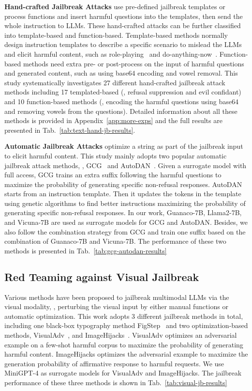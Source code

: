 \noindent\textbf{Hand-crafted Jailbreak Attacks} use pre-defined jailbreak templates or process functions and insert harmful questions into the templates, then send the whole instruction to LLMs. These hand-crafted attacks can be further classified into template-based and function-based. 
Template-based methods normally design instruction templates to describe a specific scenario to mislead the LLMs and elicit harmful content, such as role-playing~\cite{wei2024jailbroken} and do-anything-now~\cite{wei2024jailbroken}. 
Function-based methods need extra pre- or post-process on the input of harmful questions and generated content, such as using base64 encoding and vowel removal. 
This study systematically investigates 27 different hand-crafted jailbreak attack methods including 17 templated-based (\eg, refusal suppression and evil confidant) and 10 function-based methods (\eg, encoding the harmful questions using base64 and removing vowels from the questions). Detailed information about all these methods is provided in Appendix~\ref{app:more-exps} and the full results are presented in Tab.~\ref{tab:text-hand-jb-results}.

\noindent\textbf{Automatic Jailbreak Attacks} optimize a string as part of the jailbreak input to elicit harmful content. This study mainly adopts two popular automatic jailbreak attack methods, \ie, GCG~\citep{zou2023universal} and AutoDAN~\citep{liu2023autodan}. Given a surrogate model with full access, GCG trains an extra suffix following the harmful questions to maximize the probability of generating specific non-refusal responses. AutoDAN starts from an instruction template. Then it updates the tokens in the template using genetic algorithms to find better instructions maximizing the probability of generating specific non-refusal responses. 
In our work, Guanaco-7B, Llama2-7B, and Vicuna-7B are used as surrogate models for GCG and AutoDAN. Besides, we also follow the combination strategy from GCG and train one suffix based on the combination of Guanaco-7B and Vicuna-7B. 
The performance of these two methods is presented in Tab.~\ref{tab:gcg-autodan-results}

\subsection{Red Teaming against Visual Jailbreak}
Various methods have been proposed to jailbreak multimodal LLMs via the visual modality, \ie, perturbing the visual input by either manual functions or automatic optimization. This work adopts 3 different jailbreak methods in total, including one black-box typography method FigStep~\citep{gong2023figstep} and two optimization-based methods, \ie VisualAdv~\citep{qi2023visual}, and ImageHijacks~\citep{bailey2023image}. VisualAdv optimizes an adversarial example on a few-shot harmful corpus to maximize the probability of generating harmful content. ImageHijacks optimizes the adversarial example to maximize the generation probability of affirmative response to harmful requests.
We use MiniGPT-4 as surrogate models for VisualAdv and ImageHijacks. The jailbreak performance of these three methods is shown in Tab.~\ref{tab:visual-jb-results}

